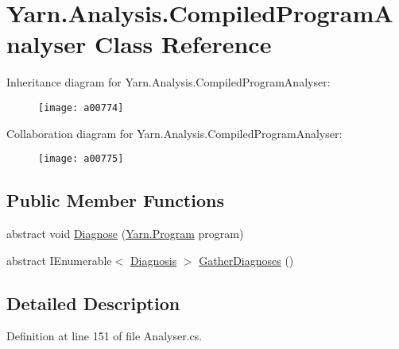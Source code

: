 \hypertarget{a00055}{\section{Yarn.\-Analysis.\-Compiled\-Program\-Analyser Class Reference}
\label{a00055}
}


Inheritance diagram for Yarn.\-Analysis.\-Compiled\-Program\-Analyser\-:
\nopagebreak
\begin{figure}[H]
\begin{center}
\leavevmode
\texttt{[image: a00774]}
\end{center}
\end{figure}


Collaboration diagram for Yarn.\-Analysis.\-Compiled\-Program\-Analyser\-:
\nopagebreak
\begin{figure}[H]
\begin{center}
\leavevmode
\texttt{[image: a00775]}
\end{center}
\end{figure}
\subsection*{Public Member Functions}
\begin{DoxyCompactItemize}
\item 
abstract void \hyperlink{a00055_aba4a36cb823b11ee491074e26477d084}{Diagnose} (\hyperlink{a00154}{Yarn.\-Program} program)
\item 
abstract I\-Enumerable$<$ \hyperlink{a00093}{Diagnosis} $>$ \hyperlink{a00055_afe059a2ceeabe50380b000420e512bd6}{Gather\-Diagnoses} ()
\end{DoxyCompactItemize}


\subsection{Detailed Description}


Definition at line 151 of file Analyser.\-cs.



